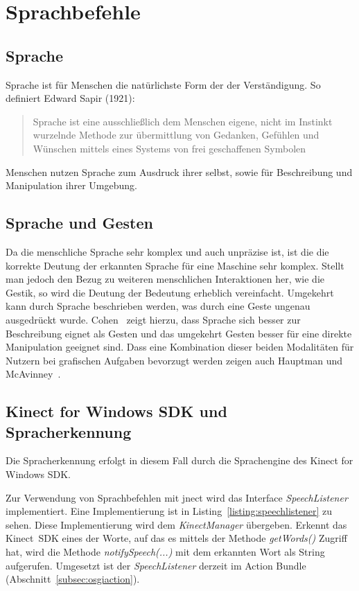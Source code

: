 \chapter{Sprachbefehle}
\label{chap:Sprachbefehle}

\section{Sprache}

Sprache ist f\"ur Menschen die nat\"urlichste Form der der Verst\"andigung. So definiert Edward Sapir (1921): 
\begin{quote}
Sprache ist eine ausschlie\ss lich dem Menschen eigene, nicht im Instinkt wurzelnde Methode zur \"ubermittlung von 
Gedanken, Gef\"uhlen und W\"unschen mittels eines Systems von frei geschaffenen Symbolen\footnotemark[1]
\end{quote}
Menschen nutzen Sprache zum Ausdruck ihrer selbst, sowie f\"ur Beschreibung und Manipulation ihrer Umgebung.


\section{Sprache und Gesten}

Da die menschliche Sprache sehr komplex und auch unpr\"azise ist, ist die die korrekte Deutung der erkannten Sprache f\"ur eine Maschine sehr komplex.
Stellt man jedoch den Bezug zu weiteren menschlichen Interaktionen her, wie die Gestik, so wird die Deutung der Bedeutung erheblich vereinfacht.
Umgekehrt kann durch Sprache beschrieben werden, was durch eine Geste ungenau ausgedr\"uckt wurde.
Cohen~\cite{bib:cohen1,bib:cohen2} zeigt hierzu, dass Sprache sich besser zur Beschreibung eignet als Gesten und das umgekehrt Gesten besser f\"ur
eine direkte Manipulation geeignet sind.
Dass eine Kombination dieser beiden Modalit\"aten f\"ur Nutzern bei grafischen Aufgaben bevorzugt werden zeigen auch Hauptman und McAvinney~\cite{bib:hauptmann}.

\section{Kinect for Windows SDK und Spracherkennung}

Die Spracherkennung erfolgt in diesem Fall durch die Sprachengine des Kinect for Windows SDK.

Zur Verwendung von Sprachbefehlen mit jnect wird das Interface \textit{SpeechListener} implementiert. Eine Implementierung ist in 
Listing~\ref{listing:speechlistener} zu sehen. Diese Implementierung wird dem \textit{KinectManager} \"ubergeben. Erkennt das 
Kinect~SDK eines der Worte, auf das es mittels der Methode \textit{getWords()} Zugriff hat, wird die Methode \textit{notifySpeech(...)} mit dem 
erkannten Wort als String aufgerufen. Umgesetzt ist der \textit{SpeechListener} derzeit im Action Bundle (Abschnitt~\ref{subsec:osgiaction}).

